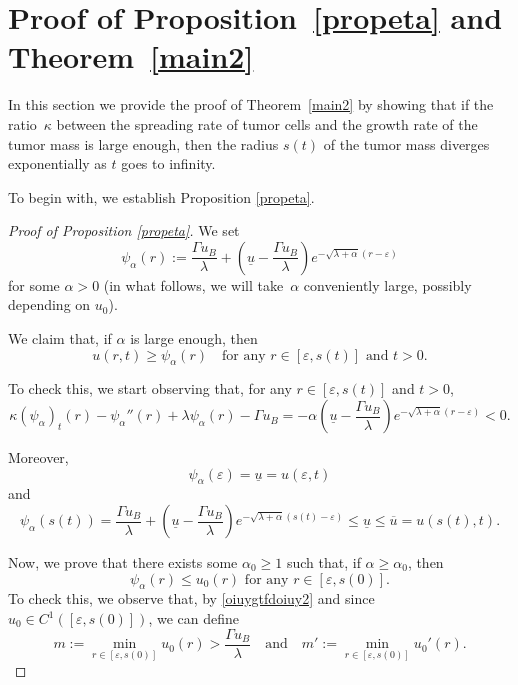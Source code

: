 \documentclass[12pt,a4paper,intlimits,sumlimits]{amsart}
\theoremstyle{definition}
\theoremstyle{plain}
\numberwithin{equation}{section}
\renewcommand{\leq}{\leqslant}
\renewcommand{\geq}{\geqslant}
\renewcommand{\ge}{\geqslant}
\begin{document}
\section{Proof of Proposition~\ref{propeta} and Theorem~\ref{main2}}\label{kpoijhuygtfrdetfyguhijk}
In this section we provide the proof of Theorem~\ref{main2}
by showing that if the
ratio~$\kappa$ between the spreading rate of tumor cells and the growth rate of the tumor mass is large enough, then the radius $s(t)$
of the tumor mass diverges exponentially as $t$ goes to infinity.

To begin with, we establish Proposition \ref{propeta}.

\begin{proof}[Proof of Proposition \ref{propeta}]
We set
\begin{equation}\label{oiuygtfdoiuy1}
\psi_\alpha(r):=\frac{\Gamma u_B}{\lambda}+\left(\underline u- \frac{\Gamma u_B}{\lambda}\right)e^{-\sqrt{\lambda+\alpha}(r-\varepsilon)}
\end{equation}
for some $\alpha>0$ (in what follows, we will take~$\alpha$ conveniently large, possibly depending on $u_0$).

We claim that, if $\alpha$ is large enough, then 
\begin{equation}\label{xcfghuicvghj}
u(r,t)\geq \psi_\alpha(r)\quad \mbox{for any $r\in [\varepsilon, s(t)]$ and $t>0$}.
\end{equation}

To check this, we start observing that, for any $r\in [\varepsilon, s(t)]$ and $t>0$,
\begin{equation}\label{MAPLNSOJHNED:001}
\kappa (\psi_\alpha)_t(r)-\psi_\alpha''(r)+\lambda\psi_\alpha(r)-\Gamma u_B =-\alpha\left(\underline u- \frac{\Gamma u_B}{\lambda}\right)e^{-\sqrt{\lambda+\alpha}(r-\varepsilon)}<0.
\end{equation}

Moreover, 
\begin{equation}\label{MAPLNSOJHNED:002}
\psi_\alpha(\varepsilon)=\underline u=u(\varepsilon,t)
\end{equation}
and
\begin{equation}\label{MAPLNSOJHNED:003}
\psi_\alpha(s(t))=\frac{\Gamma u_B}{\lambda}+\left(\underline u- \frac{\Gamma u_B}{\lambda}\right)e^{-\sqrt{\lambda+\alpha}(s(t)-\varepsilon)}\leq \underline u \leq \overline u =u(s(t),t).
\end{equation}

Now, we prove that there exists some $\alpha_0\ge1$ such that, if $\alpha\geq \alpha_0$, then 
\begin{equation}\label{xcghjcvghuvb2poj4e.P.kf0w}
{\mbox{$\psi_\alpha(r)\leq u_0(r)$ for any $r\in [\varepsilon, s(0)]$.}}\end{equation}
To check this, we observe that,
by \eqref{oiuygtfdoiuy2} and since $u_0\in C^1([\varepsilon,s(0)])$, we can define
\[
m:=\min_{r\in [\varepsilon, s(0)]}u_0(r)>\frac{\Gamma u_B}{\lambda}
\quad \mbox{and} \quad m':=\min_{r\in [\varepsilon, s(0)]}u_0'(r).
\]


\end{proof}
\end{document}

